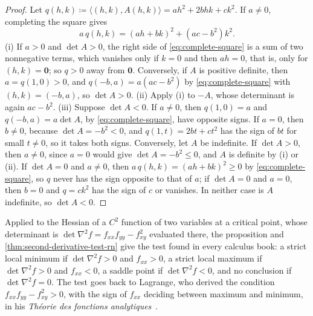 \begin{proof}
Let $q(h,k)\coloneqq\langle(h,k),A(h,k)\rangle=ah^2+2bhk+ck^2$. If $a\ne0$, completing the square gives
\begin{equation}
a\,q(h,k)=(ah+bk)^2+(ac-b^2)k^2 .
\label{eq:complete-square}
\end{equation}
(i) If $a>0$ and $\det A>0$, the right side of \eqref{eq:complete-square} is a sum of two nonnegative terms, which vanishes only if $k=0$ and then $ah=0$, that is, only for $(h,k)=\mathbf0$; so $q>0$ away from $\mathbf0$. Conversely, if $A$ is positive definite, then $a=q(1,0)>0$, and $q(-b,a)=a(ac-b^2)$ by \eqref{eq:complete-square} with $(h,k)=(-b,a)$, so $\det A>0$. (ii) Apply (i) to $-A$, whose determinant is again $ac-b^2$. (iii) Suppose $\det A<0$. If $a\ne0$, then $q(1,0)=a$ and $q(-b,a)=a\det A$, by \eqref{eq:complete-square}, have opposite signs. If $a=0$, then $b\ne0$, because $\det A=-b^2<0$, and $q(1,t)=2bt+ct^2$ has the sign of $bt$ for small $t\ne0$, so it takes both signs. Conversely, let $A$ be indefinite. If $\det A>0$, then $a\ne0$, since $a=0$ would give $\det A=-b^2\le0$, and $A$ is definite by (i) or (ii). If $\det A=0$ and $a\ne0$, then $a\,q(h,k)=(ah+bk)^2\ge0$ by \eqref{eq:complete-square}, so $q$ never has the sign opposite to that of $a$; if $\det A=0$ and $a=0$, then $b=0$ and $q=ck^2$ has the sign of $c$ or vanishes. In neither case is $A$ indefinite, so $\det A<0$.
\end{proof}

Applied to the Hessian of a $C^2$ function of two variables at a critical point, whose determinant is $\det\nabla^2f=f_{xx}f_{yy}-f_{xy}^2$ evaluated there, the proposition and \cref{thm:second-derivative-test-rn} give the test found in every calculus book: a strict local minimum if $\det\nabla^2f>0$ and $f_{xx}>0$, a strict local maximum if $\det\nabla^2f>0$ and $f_{xx}<0$, a saddle point if $\det\nabla^2f<0$, and no conclusion if $\det\nabla^2f=0$. The test goes back to Lagrange, who derived the condition $f_{xx}f_{yy}-f_{xy}^2>0$, with the sign of $f_{xx}$ deciding between maximum and minimum, in his \emph{Th\'eorie des fonctions analytiques}~\cite[pp.~188--189]{lagrange1797}.

